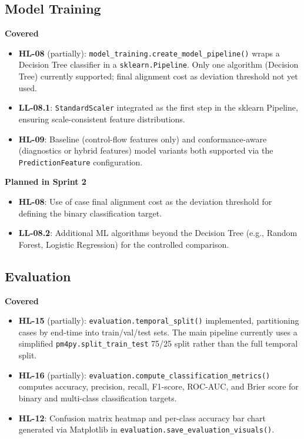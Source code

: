 \documentclass[12pt,a4paper]{article}
\begin{document}
\subsection{Model Training}
\textbf{Covered}
\begin{itemize}
    \item \textbf{HL-08} (partially): \texttt{model\_training.create\_model\_pipeline()} wraps a Decision Tree classifier in a \texttt{sklearn.Pipeline}. Only one algorithm (Decision Tree) currently supported; final alignment cost as deviation threshold not yet used.
    \item \textbf{LL-08.1}: \texttt{StandardScaler} integrated as the first step in the sklearn Pipeline, ensuring scale-consistent feature distributions.
    \item \textbf{HL-09}: Baseline (control-flow features only) and conformance-aware (diagnostics or hybrid features) model variants both supported via the \texttt{PredictionFeature} configuration.
\end{itemize}

\noindent \textbf{Planned in Sprint 2}
\begin{itemize}
    \item \textbf{HL-08}: Use of case final alignment cost as the deviation threshold for defining the binary classification target.
    \item \textbf{LL-08.2}: Additional ML algorithms beyond the Decision Tree (e.g., Random Forest, Logistic Regression) for the controlled comparison.
\end{itemize}

\subsection{Evaluation}

\textbf{Covered}
\begin{itemize}
    \item \textbf{HL-15} (partially): \texttt{evaluation.temporal\_split()} implemented, partitioning cases by end-time into train/val/test sets. The main pipeline currently uses a simplified \texttt{pm4py.split\_train\_test} 75/25 split rather than the full temporal split.
    \item \textbf{HL-16} (partially): \texttt{evaluation.compute\_classification\_metrics()} computes accuracy, precision, recall, F1-score, ROC-AUC, and Brier score for binary and multi-class classification targets.
    \item \textbf{HL-12}: Confusion matrix heatmap and per-class accuracy bar chart generated via Matplotlib in \texttt{evaluation.save\_evaluation\_visuals()}.
\end{itemize}
\end{document}
